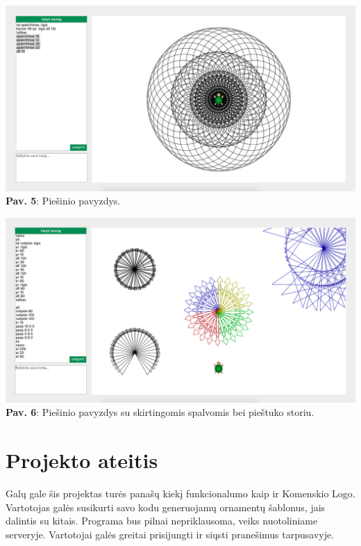 \documentclass[a4paper,12pt]{article}
\begin{document}
\begin{center}
\includegraphics[scale=0.5]{ManoPvz2.png}\\
\textbf{Pav. 5}: Piešinio pavyzdys.\\
\end{center}

\begin{center}
\includegraphics[scale=0.5]{ManoPvz3.png}\\
\textbf{Pav. 6}: Piešinio pavyzdys su skirtingomis spalvomis bei pieštuko storiu.\\
\end{center}

\section{Projekto ateitis}

Galų gale šis projektas turės panašų kiekį funkcionalumo kaip ir Komenskio Logo. Vartotojas galės susikurti savo kodu generuojamų ornamentų šablonus, jais dalintis su kitais. Programa bus pilnai nepriklausoma, veiks nuotoliniame serveryje. Vartotojai galės greitai prisijungti ir siųsti pranešimus tarpusavyje.  \
\end{document}
